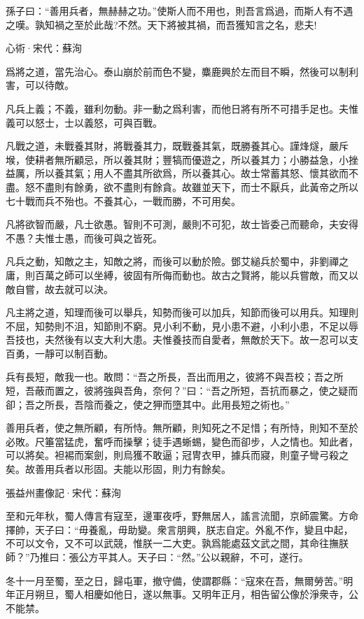 \documentclass[12pt,a4paper]{ctexbook}
\begin{document}
孫子曰：“善用兵者，無赫赫之功。”使斯人而不用也，則吾言爲過，而斯人有不遇之嘆。孰知禍之至於此哉?不然。天下將被其禍，而吾獲知言之名，悲夫!\par
心術·宋代：蘇洵 \par
爲將之道，當先治心。泰山崩於前而色不變，麋鹿興於左而目不瞬，然後可以制利害，可以待敵。\par
凡兵上義；不義，雖利勿動。非一動之爲利害，而他日將有所不可措手足也。夫惟義可以怒士，士以義怒，可與百戰。\par
凡戰之道，未戰養其財，將戰養其力，既戰養其氣，既勝養其心。謹烽燧，嚴斥堠，使耕者無所顧忌，所以養其財；豐犒而優遊之，所以養其力；小勝益急，小挫益厲，所以養其氣；用人不盡其所欲爲，所以養其心。故士常蓄其怒、懷其欲而不盡。怒不盡則有餘勇，欲不盡則有餘貪。故雖並天下，而士不厭兵，此黃帝之所以七十戰而兵不殆也。不養其心，一戰而勝，不可用矣。\par
凡將欲智而嚴，凡士欲愚。智則不可測，嚴則不可犯，故士皆委己而聽命，夫安得不愚？夫惟士愚，而後可與之皆死。\par
凡兵之動，知敵之主，知敵之將，而後可以動於險。鄧艾縋兵於蜀中，非劉禪之庸，則百萬之師可以坐縛，彼固有所侮而動也。故古之賢將，能以兵嘗敵，而又以敵自嘗，故去就可以決。\par
凡主將之道，知理而後可以舉兵，知勢而後可以加兵，知節而後可以用兵。知理則不屈，知勢則不沮，知節則不窮。見小利不動，見小患不避，小利小患，不足以辱吾技也，夫然後有以支大利大患。夫惟養技而自愛者，無敵於天下。故一忍可以支百勇，一靜可以制百動。\par
兵有長短，敵我一也。敢問：“吾之所長，吾出而用之，彼將不與吾校；吾之所短，吾蔽而置之，彼將強與吾角，奈何？”曰：“吾之所短，吾抗而暴之，使之疑而卻；吾之所長，吾陰而養之，使之狎而墮其中。此用長短之術也。”\par
善用兵者，使之無所顧，有所恃。無所顧，則知死之不足惜；有所恃，則知不至於必敗。尺箠當猛虎，奮呼而操擊；徒手遇蜥蜴，變色而卻步，人之情也。知此者，可以將矣。袒裼而案劍，則烏獲不敢逼；冠冑衣甲，據兵而寢，則童子彎弓殺之矣。故善用兵者以形固。夫能以形固，則力有餘矣。\par
張益州畫像記·宋代：蘇洵 \par
至和元年秋，蜀人傳言有寇至，邊軍夜呼，野無居人，謠言流聞，京師震驚。方命擇帥，天子曰：“毋養亂，毋助變。衆言朋興，朕志自定。外亂不作，變且中起，不可以文令，又不可以武競，惟朕一二大吏。孰爲能處茲文武之間，其命往撫朕師？”乃推曰：張公方平其人。天子曰：“然。”公以親辭，不可，遂行。\par
冬十一月至蜀，至之日，歸屯軍，撤守備，使謂郡縣：“寇來在吾，無爾勞苦。”明年正月朔旦，蜀人相慶如他日，遂以無事。又明年正月，相告留公像於淨衆寺，公不能禁。\par
\end{document}
